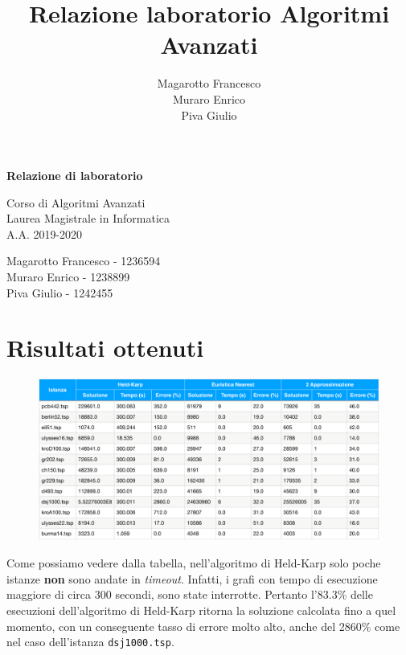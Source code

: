 \documentclass[a4paper]{article}
\title{Relazione laboratorio Algoritmi Avanzati}
\author{Magarotto Francesco\\Muraro Enrico\\Piva Giulio}
\begin{document}
\begin{titlepage}
  \vspace*{5cm}
  \begin{center}
    \Large\bfseries
    Relazione di laboratorio
  \end{center}
  \begin{center}
    \large
    Corso di Algoritmi Avanzati\\
    Laurea Magistrale in Informatica\\A.A. 2019-2020
  \end{center}
  \vspace{4cm plus 1fill}
  \begin{flushleft}
    \large
    Magarotto Francesco - 1236594\\Muraro Enrico - 1238899 \\Piva Giulio - 1242455
  \end{flushleft}
\end{titlepage}
\newpage


\section{Risultati ottenuti}
\begin{figure}[H]
	\centering
	\includegraphics[width=17cm]{tabellapdf}
\end{figure}
Come possiamo vedere dalla tabella, nell'algoritmo di Held-Karp solo poche istanze \textbf{non} sono andate in \textit{timeout}. Infatti, i grafi con tempo di esecuzione maggiore di circa 300 secondi, sono state interrotte. Pertanto l'83.3\% delle esecuzioni dell'algoritmo di Held-Karp ritorna la soluzione calcolata fino a quel momento, con un conseguente tasso di errore molto alto, anche del 2860\% come nel caso dell'istanza \texttt{dsj1000.tsp}.
\end{document}
